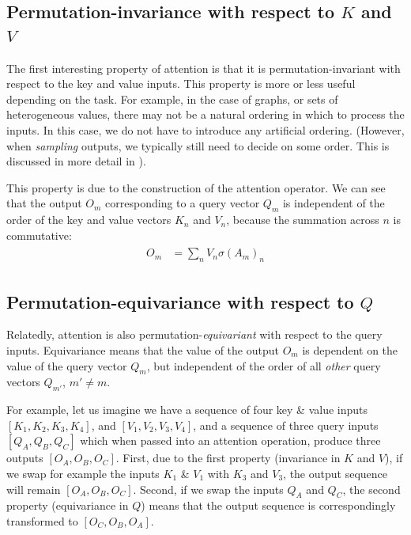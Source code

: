 \subsection{Permutation-invariance with respect to $K$ and $V$}

The first interesting property of attention is that it is permutation-invariant with respect to the key and value inputs. This property is more or less useful depending on the task. For example, in the case of graphs, or sets of heterogeneous values, there may not be a natural ordering in which to process the inputs. In this case, we do not have to introduce any artificial ordering. (However, when \textit{sampling} outputs, we typically still need to decide on some order. This is discussed in more detail in ).

This property is due to the construction of the attention operator. We can see that the output $O_m$ corresponding to a query vector $Q_m$ is independent of the order of the key and value vectors $K_n$ and $V_n$, because the summation across $n$ is commutative:
\begin{align}
\label{eqn:attn-perm-invariance}
\begin{aligned}
    O_m &= \sum_n V_n \sigma(A_{m})_n
\end{aligned}
\end{align}

\subsection{Permutation-equivariance with respect to $Q$}

Relatedly, attention is also permutation-\textit{equivariant} with respect to the query inputs. Equivariance means that the value of the output $O_m$ is dependent on the value of the query vector $Q_m$, but independent of the order of all \textit{other} query vectors $Q_{m'}$, $m' ≠ m$.

For example, let us imagine we have a sequence of four key \& value inputs $[K_1, K_2, K_3, K_4]$, and $[V_1, V_2, V_3, V_4]$, and a sequence of three query inputs $[Q_A, Q_B, Q_C]$ which when passed into an attention operation, produce three outputs $[O_A, O_B, O_C]$. First, due to the first property (invariance in $K$ and $V$), if we swap for example the inputs $K_1$ \& $V_1$ with $K_3$ and $V_3$, the output sequence will remain $[O_A, O_B, O_C]$. Second, if we swap the inputs $Q_A$ and $Q_C$, the second property (equivariance in $Q$) means that the output sequence is correspondingly transformed to $[O_C, O_B, O_A]$.


